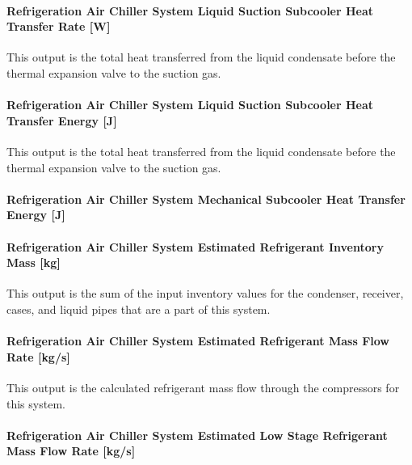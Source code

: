 \paragraph{Refrigeration Air Chiller System Liquid Suction Subcooler Heat Transfer Rate {[}W{]}}\label{refrigeration-air-chiller-system-liquid-suction-subcooler-heat-transfer-rate-w}

This output is the total heat transferred from the liquid condensate before the thermal expansion valve to the suction gas.

\paragraph{Refrigeration Air Chiller System Liquid Suction Subcooler Heat Transfer Energy {[}J{]}}\label{refrigeration-air-chiller-system-liquid-suction-subcooler-heat-transfer-energy-j}

This output is the total heat transferred from the liquid condensate before the thermal expansion valve to the suction gas.

\paragraph{Refrigeration Air Chiller System Mechanical Subcooler Heat Transfer Energy {[}J{]}}\label{refrigeration-air-chiller-system-mechanical-subcooler-heat-transfer-energy-j}

\paragraph{Refrigeration Air Chiller System Estimated Refrigerant Inventory Mass {[}kg{]}}\label{refrigeration-air-chiller-system-estimated-refrigerant-inventory-mass-kg}

This output is the sum of the input inventory values for the condenser, receiver, cases, and liquid pipes that are a part of this system.

\paragraph{Refrigeration Air Chiller System Estimated Refrigerant Mass Flow Rate {[}kg/s{]}}\label{refrigeration-air-chiller-system-estimated-refrigerant-mass-flow-rate-kgs}

This output is the calculated refrigerant mass flow through the compressors for this system.

\paragraph{Refrigeration Air Chiller System Estimated Low Stage Refrigerant Mass Flow Rate {[}kg/s{]}}\label{refrigeration-air-chiller-system-estimated-low-stage-refrigerant-mass-flow-rate-kgs}

